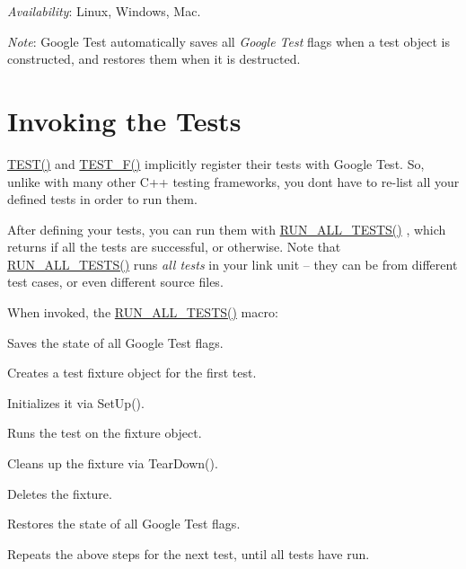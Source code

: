 {\itshape Availability}\+: Linux, Windows, Mac.

{\itshape Note}\+: Google Test automatically saves all {\itshape Google Test} flags when a test object is constructed, and restores them when it is destructed.

\section*{Invoking the Tests}

{\ttfamily \hyperlink{gtest_8h_ad8b332753515c0ab8baada563c2547eb}{T\+E\+S\+T()}} and {\ttfamily \hyperlink{gtest_8h_a0ee66d464d1a06c20c1929cae09d8758}{T\+E\+S\+T\+\_\+\+F()}} implicitly register their tests with Google Test. So, unlike with many other C++ testing frameworks, you don\textquotesingle{}t have to re-\/list all your defined tests in order to run them.

After defining your tests, you can run them with {\ttfamily \hyperlink{gtest_8h_a853a3792807489591d3d4a2f2ff9359f}{R\+U\+N\+\_\+\+A\+L\+L\+\_\+\+T\+E\+S\+T\+S()}} , which returns {} if all the tests are successful, or {} otherwise. Note that {\ttfamily \hyperlink{gtest_8h_a853a3792807489591d3d4a2f2ff9359f}{R\+U\+N\+\_\+\+A\+L\+L\+\_\+\+T\+E\+S\+T\+S()}} runs {\itshape all tests} in your link unit -- they can be from different test cases, or even different source files.

When invoked, the {\ttfamily \hyperlink{gtest_8h_a853a3792807489591d3d4a2f2ff9359f}{R\+U\+N\+\_\+\+A\+L\+L\+\_\+\+T\+E\+S\+T\+S()}} macro\+:
\begin{DoxyEnumerate}
\item Saves the state of all Google Test flags.
\end{DoxyEnumerate}
\begin{DoxyEnumerate}
\item Creates a test fixture object for the first test.
\end{DoxyEnumerate}
\begin{DoxyEnumerate}
\item Initializes it via {\ttfamily Set\+Up()}.
\end{DoxyEnumerate}
\begin{DoxyEnumerate}
\item Runs the test on the fixture object.
\end{DoxyEnumerate}
\begin{DoxyEnumerate}
\item Cleans up the fixture via {\ttfamily Tear\+Down()}.
\end{DoxyEnumerate}
\begin{DoxyEnumerate}
\item Deletes the fixture.
\end{DoxyEnumerate}
\begin{DoxyEnumerate}
\item Restores the state of all Google Test flags.
\end{DoxyEnumerate}
\begin{DoxyEnumerate}
\item Repeats the above steps for the next test, until all tests have run.
\end{DoxyEnumerate}

